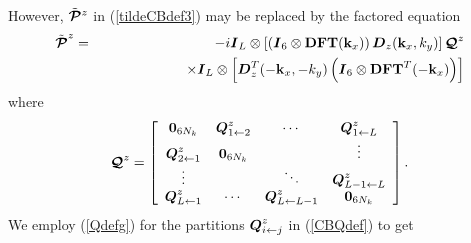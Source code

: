 However, $\tilde{\CB P}{}^{z}$ in (\ref{tildeCBdef3}) may be replaced by the 
factored equation
\begin{eqnarray} \label{GGz1}
\tilde{\CB P}^{z}
&=&-i {\bmi I}_L \otimes\left[\left({\bmi I}_6\otimes 
{\bf DFT}({\bf k}_{x}) \right){\bmi  D}_{z}({\bf k}_{x},{k}_{y})\right]
 {\CB Q}^{z}\nonumber\\
 &&\qquad\qquad\qquad
 \times
 {\bmi I}_L \otimes \left[
{\bmi  D}^{T}_{z}(-{\bf k}_{x},-{k}_{y})\left({\bmi I}_6\otimes
{\bf DFT}^{T}(-{\bf k}_{x})  \right)\right]
\end{eqnarray} 
where
\begin{equation} \label{CBQdef}
{\CB Q}^{z}=\left[{\begin{array}{cccc}
{\bf 0}_{6N_k}&{\bmi Q}^{z}_{1 
\leftarrow   2}&\cdots &{\bmi Q}^{z}_{1 \leftarrow   L}\\ {\bmi Q}^{z}_{2 
\leftarrow   1}&{\bf 0}_{6N_k}&&\vdots\\ 
\vdots&&\ddots&{\bmi Q}^{z}_{L-1 \leftarrow   L}\\ {\bmi Q}^{z}_{L \leftarrow   
1}&\cdots &{\bmi Q}^{z}_{L \leftarrow   L-1}&{\bf 0}_{6N_k}\end{array}}\right].
\end{equation}
We employ (\ref{Qdefg}) for the partitions ${\bmi Q}^{z}_{i \leftarrow   
j}$ in (\ref{CBQdef}) to get
